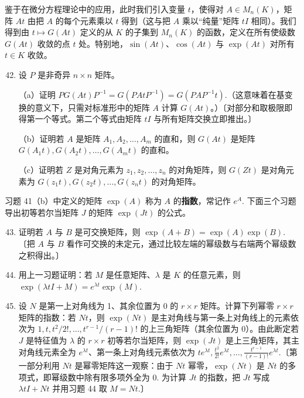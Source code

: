 \noindent 鉴于在微分方程理论中的应用，此时我们引入变量 \(t\)，使得对 \(A \in M_n(K)\)，矩阵 \(At\) 由把 \(A\) 的每个元素乘以 \(t\) 得到（这与把 \(A\) 乘以“纯量”矩阵 \(tI\) 相同）。我们得到由 \(t \mapsto G(At)\) 定义的从 \(K\) 的子集到 \(M_n(K)\) 的函数，定义在所有使级数 \(G(At)\) 收敛的点 \(t\) 处。特别地，\(\sin(At)\)、\(\cos(At)\) 与 \(\exp(At)\) 对所有 \(t \in K\) 收敛。

\begin{enumerate}
\setcounter{enumi}{41}
\item 设 \(P\) 是非奇异 \(n \times n\) 矩阵。

（a）证明 \(PG(At)P^{-1} = G(PAtP^{-1}) = G(PAP^{-1}t)\).（这意味着在基变换的意义下，只需对标准形中的矩阵 \(A\) 计算 \(G(At)\)。）〔对部分和取极限即得第一个等式。第二个等式由矩阵 \(tI\) 与所有矩阵交换立即推出。〕

（b）证明若 \(A\) 是矩阵 \(A_1, A_2, \ldots, A_m\) 的直和，则 \(G(At)\) 是矩阵 \(G(A_1t), G(A_2t), \ldots, G(A_mt)\) 的直和。

（c）证明若 \(Z\) 是对角元素为 \(z_1, z_2, \ldots, z_n\) 的对角矩阵，则 \(G(Zt)\) 是对角元素为 \(G(z_1t), G(z_2t), \ldots, G(z_nt)\) 的对角矩阵。
\end{enumerate}

\noindent 习题 41（b）中定义的矩阵 \(\exp(A)\) 称为 \(A\) 的\textbf{指数}，常记作 \(e^A\). 下面三个习题导出初等若尔当矩阵 \(J\) 的矩阵 \(\exp(Jt)\) 的公式。

\begin{enumerate}
\setcounter{enumi}{42}
\item 证明若 \(A\) 与 \(B\) 是可交换矩阵，则 \(\exp(A+B) = \exp(A)\exp(B)\).〔把 \(A\) 与 \(B\) 看作可交换的未定元，通过比较左端的幂级数与右端两个幂级数之积得出。〕

\item 用上一习题证明：若 \(M\) 是任意矩阵、\(\lambda\) 是 \(K\) 的任意元素，则 \(\exp(\lambda tI+M) = e^{\lambda t}\exp(M)\).

\item 设 \(N\) 是第一上对角线为 1、其余位置为 0 的 \(r \times r\) 矩阵。计算下列幂零 \(r \times r\) 矩阵的指数：若 \(Nt\)，则 \(\exp(Nt)\) 是主对角线与第一条上对角线上的元素依次为 \(1, t, t^2/2!, \ldots, t^{r-1}/(r-1)!\) 的上三角矩阵（其余位置为 0）。由此断定若 \(J\) 是特征值为 \(\lambda\) 的 \(r \times r\) 初等若尔当矩阵，则 \(\exp(Jt)\) 是上三角矩阵，其主对角线元素全为 \(e^{\lambda t}\)、第一条上对角线元素依次为 \(te^{\lambda t}, \frac{t^2}{2!}e^{\lambda t}, \ldots, \frac{t^{r-1}}{(r-1)!}e^{\lambda t}\).〔第一部分利用 \(Nt\) 是幂零矩阵这一观察：由于 \(Nt\) 幂零，\(\exp(Nt)\) 是 \(Nt\) 的多项式，即幂级数中除有限多项外全为 0. 为计算 \(Jt\) 的指数，把 \(Jt\) 写成 \(\lambda tI+Nt\) 并用习题 44 取 \(M = Nt\).〕
\end{enumerate}

